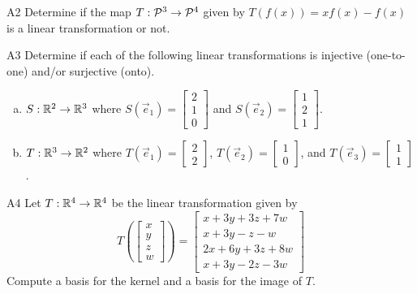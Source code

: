 \documentclass{sbgLAexam}
\begin{document}
\begin{problem}{A2}
Determine if the map $T: \P^3 \rightarrow \P^4$ given by $T(f(x))=xf(x)-f(x)$ is a linear transformation or not.
\end{problem}
\newpage

\begin{problem}{A3}
Determine if each of the following linear transformations is injective (one-to-one) and/or surjective (onto).
\begin{enumerate}[(a)]
\item
  \(S: \IR^2 \rightarrow \IR^3\) where
  \(S(\vec e_1)=\begin{bmatrix}
    2 \\
    1 \\
    0
  \end{bmatrix}\) and
  \(S(\vec e_2)=\begin{bmatrix}
    1 \\
    2 \\
    1
  \end{bmatrix}\).
\item
  \(T: \IR^3 \rightarrow \IR^2\) where
  \(T(\vec e_1)=\begin{bmatrix}
    2 \\
    2
  \end{bmatrix}\),
  \(T(\vec e_2)=\begin{bmatrix}
   1  \\
   0
  \end{bmatrix}\), and
  \(T(\vec e_3)=\begin{bmatrix}
    1 \\
    1
  \end{bmatrix}\).
\end{enumerate}
\end{problem}

\begin{problem}{A4}
Let $T: \IR^4\rightarrow \IR^4$ be the linear transformation given by $$T\left(\begin{bmatrix} x \\ y \\ z \\ w \end{bmatrix} \right) = \begin{bmatrix} x+3y+3z+7w \\ x+3y-z-w \\ 2x+6y+3z+8w \\ x+3y-2z-3w \end{bmatrix}$$
Compute a basis for the kernel and a basis for the image of $T$.
\end{problem}
\newpage
\end{document}
